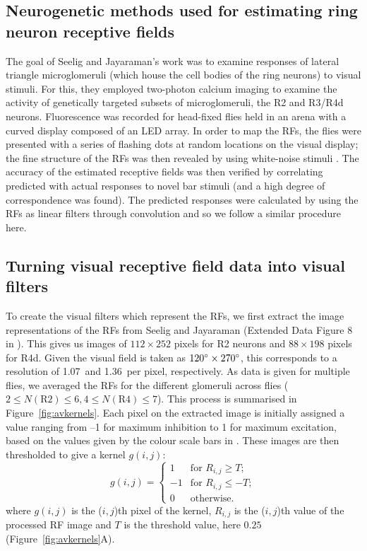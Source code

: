 \subsection*{Neurogenetic methods used for estimating ring neuron receptive fields}
\label{sec:methods:seelig}
The goal of Seelig and Jayaraman's work \cite{Seelig2013} was to examine responses of lateral triangle microglomeruli (which house the cell bodies of the ring neurons) to visual stimuli.
For this, they employed two-photon calcium imaging to examine the activity of genetically targeted subsets of microglomeruli, the R2 and R3/R4d neurons.
Fluorescence was recorded for head-fixed flies held in an arena with a curved display composed of an LED array.
In order to map the RFs, the flies were presented with a series of flashing dots at random locations on the visual display; the fine structure of the RFs was then revealed by using white-noise stimuli \cite{Weber2010}.
The accuracy of the estimated receptive fields was then verified by correlating predicted with actual responses to novel bar stimuli (and a high degree of correspondence was found).
The predicted responses were calculated by using the RFs as linear filters through convolution and so we follow a similar procedure here.

\subsection*{Turning visual receptive field data into visual filters}
\label{sec:methods:preprocessing}
To create the visual filters which represent the RFs, we first extract the image representations of the RFs from Seelig and Jayaraman (Extended Data Figure 8 in \cite{Seelig2013}).
This gives us images of $112\times 252$ pixels for R2 neurons and $88\times 198$ pixels for R4d.
Given the visual field is taken as $120\degree\times 270\degree$, this corresponds to a resolution of 1.07\degree\ and 1.36\degree\ per pixel, respectively.
As data is given for multiple flies, we averaged the RFs for the different glomeruli across flies ($2\le N(\mathrm{R2}) \le 6, 4\le N(\mathrm{R4})\le 7$).
This process is summarised in Figure~\ref{fig:avkernels}.
Each pixel on the extracted image is initially assigned a value ranging from --1 for maximum inhibition to 1 for maximum excitation, based on the values given by the colour scale bars in \cite{Seelig2013}.
These images are then thresholded to give a kernel $g(i,j)$:
$$
g(i,j) = \left\{ \begin{array}{rl}
1 & \mbox{for } R_{i,j} \ge T; \\
-1 & \mbox{for } R_{i,j} \le -T; \\
0 & \mbox{otherwise.}
\end{array}
\right.
$$
where $g(i,j)$ is the ($i,j$)th pixel of the kernel, $R_{i,j}$ is the ($i,j$)th value of the processed RF image and $T$ is the threshold value, here $0.25$ (Figure~\ref{fig:avkernels}A).

